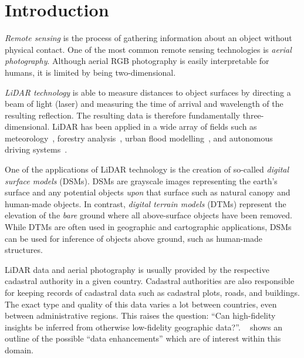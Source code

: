 \section*{Introduction}
\setcounter{page}{1}  %

\textit{Remote sensing} is the process of gathering information about an object without physical contact.
One of the most common remote sensing technologies is \textit{aerial photography}.
Although aerial RGB photography is easily interpretable for humans, it is limited by being two-dimensional.

\textit{LiDAR technology} is able to measure distances to object surfaces by directing a beam of light (laser) and measuring the time of arrival and wavelength of the resulting reflection.
The resulting data is therefore fundamentally three-dimensional.
LiDAR has been applied in a wide array of fields such as meteorology~\cite{lidar_meteorology_1966}, forestry analysis~\cite{lidar_forestry_2000}, urban flood modelling~\cite{lidar_flood_2013}, and autonomous driving systems~\cite{lidar_self_driving_2018}.

One of the applications of LiDAR technology is the creation of so-called \textit{digital surface models} (DSMs).
DSMs are grayscale images representing the earth's surface and any potential objects \textit{upon} that surface such as natural canopy and human-made objects.
In contrast, \textit{digital terrain models} (DTMs) represent the elevation of the \textit{bare} ground where all above-surface objects have been removed.
While DTMs are often used in geographic and cartographic applications, DSMs can be used for inference of objects above ground, such as human-made structures.

LiDAR data and aerial photography is usually provided by the respective cadastral authority in a given country.
Cadastral authorities are also responsible for keeping records of cadastral data such as cadastral plots, roads, and buildings.
The exact type and quality of this data varies a lot between countries, even between administrative regions.
This raises the question: \enquote{Can high-fidelity insights be inferred from otherwise low-fidelity geographic data?}.
~ shows an outline of the possible \enquote{data enhancements} which are of interest within this domain.

